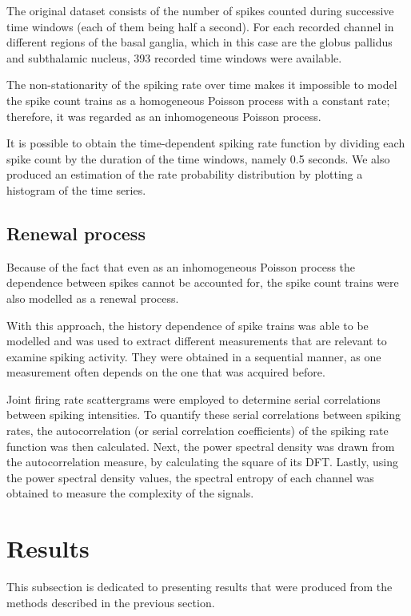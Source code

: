 \documentclass{article}
\begin{document}
The original dataset consists of the number of spikes counted during successive time windows (each of them being half a second). 
For each recorded channel in different regions of the basal ganglia, which in this case are the globus pallidus and subthalamic nucleus, 393 recorded time windows were available.

The non-stationarity of the spiking rate over time makes it impossible to model the spike count trains as a homogeneous Poisson process with a constant rate; therefore, it was regarded as an inhomogeneous Poisson process.

It is possible to obtain the time-dependent spiking rate function by dividing each spike count by the duration of the time windows, namely 0.5 seconds. 
We also produced an estimation of the rate probability distribution by plotting a histogram of the time series.

\subsection{Renewal process}\label{RP Method}

Because of the fact that even as an inhomogeneous Poisson process the dependence between spikes cannot be accounted for, the spike count trains were also modelled as a renewal process.

With this approach, the history dependence of spike trains was able to be modelled and was used to extract different measurements that are relevant to examine spiking activity. 
They were obtained in a sequential manner, as one measurement often depends on the one that was acquired before.

Joint firing rate scattergrams were employed to determine serial correlations between spiking intensities. 
To quantify these serial correlations between spiking rates, the autocorrelation (or serial correlation coefficients) of the spiking rate function was then calculated. 
Next, the power spectral density was drawn from the autocorrelation measure, by calculating the square of its DFT. 
Lastly, using the power spectral density values, the spectral entropy of each channel was obtained to measure the complexity of the signals.

\newpage
\section{Results}

This subsection is dedicated to presenting results that were produced from the methods described in the previous section.
\end{document}
